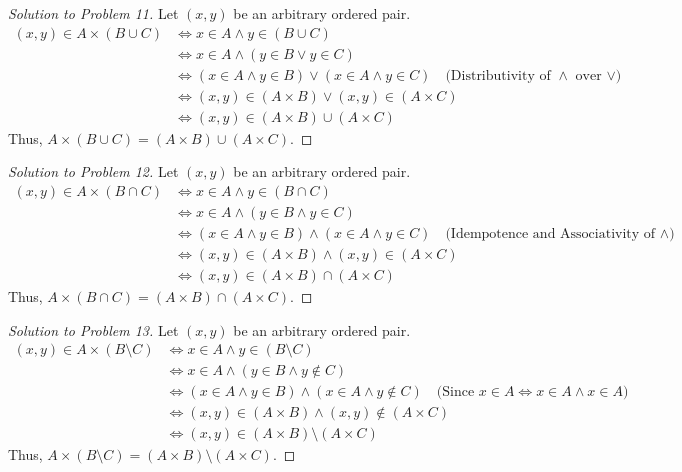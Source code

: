 \documentclass[11pt]{article}
\begin{document}
\begin{proof}[Solution to Problem 11]
Let $(x,y)$ be an arbitrary ordered pair.
\begin{align*}
(x,y) \in A \times (B \cup C) &\iff x \in A \land y \in (B \cup C) \\
&\iff x \in A \land (y \in B \lor y \in C) \\
&\iff (x \in A \land y \in B) \lor (x \in A \land y \in C) \quad \text{(Distributivity of } \land \text{ over } \lor) \\
&\iff (x,y) \in (A \times B) \lor (x,y) \in (A \times C) \\
&\iff (x,y) \in (A \times B) \cup (A \times C)
\end{align*}
Thus, $A \times (B \cup C) = (A \times B) \cup (A \times C)$.
\end{proof}

\begin{proof}[Solution to Problem 12]
Let $(x,y)$ be an arbitrary ordered pair.
\begin{align*}
(x,y) \in A \times (B \cap C) &\iff x \in A \land y \in (B \cap C) \\
&\iff x \in A \land (y \in B \land y \in C) \\
&\iff (x \in A \land y \in B) \land (x \in A \land y \in C) \quad \text{(Idempotence and Associativity of } \land) \\
&\iff (x,y) \in (A \times B) \land (x,y) \in (A \times C) \\
&\iff (x,y) \in (A \times B) \cap (A \times C)
\end{align*}
Thus, $A \times (B \cap C) = (A \times B) \cap (A \times C)$.
\end{proof}

\begin{proof}[Solution to Problem 13]
Let $(x,y)$ be an arbitrary ordered pair.
\begin{align*}
(x,y) \in A \times (B \setminus C) &\iff x \in A \land y \in (B \setminus C) \\
&\iff x \in A \land (y \in B \land y \notin C) \\
&\iff (x \in A \land y \in B) \land (x \in A \land y \notin C) \quad \text{(Since } x \in A \iff x \in A \land x \in A) \\
&\iff (x,y) \in (A \times B) \land (x,y) \notin (A \times C) \\
&\iff (x,y) \in (A \times B) \setminus (A \times C)
\end{align*}
Thus, $A \times (B \setminus C) = (A \times B) \setminus (A \times C)$.
\end{proof}
\end{document}
